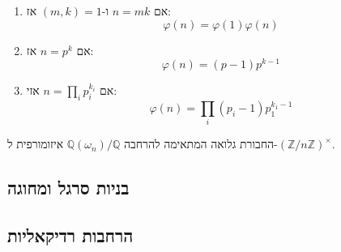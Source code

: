 \documentclass{tstextbook}
\begin{document}
\begin{corollary}
  \begin{enumerate}
    \item אם \(n=mk\) ו-\((m,k)=1\) אז: 
$$\varphi(n)=\varphi(1)\varphi(n)$$


    \item אם \(n=p^k\) אז: 
$$\varphi(n)=(p-1)p^{k-1}$$


    \item אם \(n=\prod_{i}p_{i}^{k_{i}}\) אזי: 
$$\varphi (n)= \prod_{i}(p_{i}-1)p_{1}^{k_{1}-1}$$


  \end{enumerate}
\end{corollary}
\begin{theorem}
החבורת גלואה המתאימה להרחבה \(\mathbb{Q}\left( \omega_{n} \right) / \mathbb{Q}\) איזומורפית ל-\(\left( \mathbb{Z} / n\mathbb{Z} \right)^\times\).

\end{theorem}
\subsection{בניות סרגל ומחוגה}

\subsection{הרחבות רדיקאליות}
\end{document}
